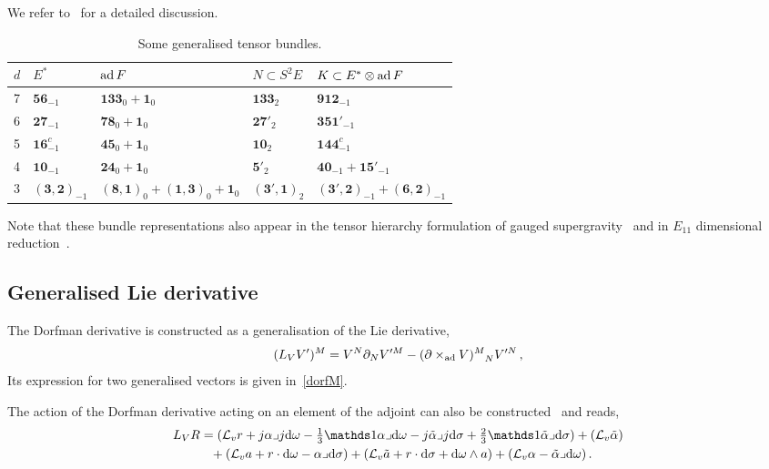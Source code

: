 \documentclass[debug]{phd}
\begin{document}
			We refer to~\cite{waldram4} for a detailed discussion.
					\begin{table}[h!]
						\centering
						\begin{tabular}{l l l l l }
							$d$	&	$E^*$					&	$\operatorname{ad} F$													& 	$N \subset S^2 E$			&$K \subset E^* \otimes \operatorname{ad} F$	\\
							\midrule
							7	& 	$\mathbf{56}_{-1}$			&	$\mathbf{133}_0 + \mathbf{1}_0$								&	$\mathbf{133}_2$			&$\mathbf{912}_{-1}$		\\[1.2mm]
							6 	&	$\mathbf{27}_{-1}$			&	$\mathbf{78}_0 + \mathbf{1}_0$								&	$\mathbf{27'}_2$			&$\mathbf{351'}_{-1}$		\\[1.2mm]
							5  	&	$\mathbf{16}^c_{-1}$			&	$\mathbf{45}_0 + \mathbf{1}_0$								&	$\mathbf{10}_2$			&$\mathbf{144}^c_{-1}$		\\[1.2mm]
							4	&	$\mathbf{10}_{-1}$			&	$\mathbf{24}_0 + \mathbf{1}_0$								&	$\mathbf{5'}_2$				&$\mathbf{40}_{-1} + \mathbf{15}'_{-1}$		\\[1.2mm]
							3	&	$(\mathbf{3},\mathbf{2})_{-1}$	&	$(\mathbf{8},\mathbf{1})_0 + (\mathbf{1}, \mathbf{3})_0 + \mathbf{1}_0$	&	$(\mathbf{3'},\mathbf{1})_{2}$	&$(\mathbf{3'},\mathbf{2})_{-1} + (\mathbf{6},\mathbf{2})_{-1}$		\\[1.2mm]
							\bottomrule
						\end{tabular}
						\caption{Some generalised tensor bundles.}
						\label{tab:EddRep}
					\end{table}
			Note that these bundle representations also appear in the tensor hierarchy formulation of gauged supergravity~\cite{Ciceri:2014wya, TensorHier1} and in $E_{11}$ dimensional reduction~\cite{E11PetW, E11Berg}.
			\subsection{Generalised Lie derivative}
				The Dorfman derivative is constructed as a generalisation of the Lie derivative,
						\begin{equation}
							(L_V V')^M =  V^N \partial_N  V^{\prime M} - (\partial \times_{\mathrm{ad}} V)^M_{\phantom{M}N} V^{\prime N} \, , 
						\end{equation}
				Its expression for two generalised vectors is given in~\eqref{dorfM}.
				
				The action of the Dorfman derivative acting on an element of the adjoint can also be constructed~\cite{waldram4} and reads,
						\begin{equation}\label{eq:M_Dorf_adjoint}
							\begin{split}
								L_{V} R & =(\mathcal{L}_{v}r+ j\alpha \lrcorner j\dd\omega-\tfrac{1}{3}\id\alpha\lrcorner\dd\omega-j\tilde{\alpha}\lrcorner j\dd\sigma+\tfrac{2}{3}\id\tilde{\alpha}\lrcorner\dd\sigma) +(\mathcal{L}_{v}\tilde{\alpha}) \\
 & \phantom{=} + (\mathcal{L}_{v}a+r\cdot\dd\omega-\alpha\lrcorner\dd\sigma) +(\mathcal{L}_{v}\tilde{a}+r\cdot\dd\sigma+\dd\omega\wedge a)+(\mathcal{L}_{v}\alpha-\tilde{\alpha}\lrcorner\dd\omega)\, .
							\end{split}
						\end{equation}
				
\end{document}
